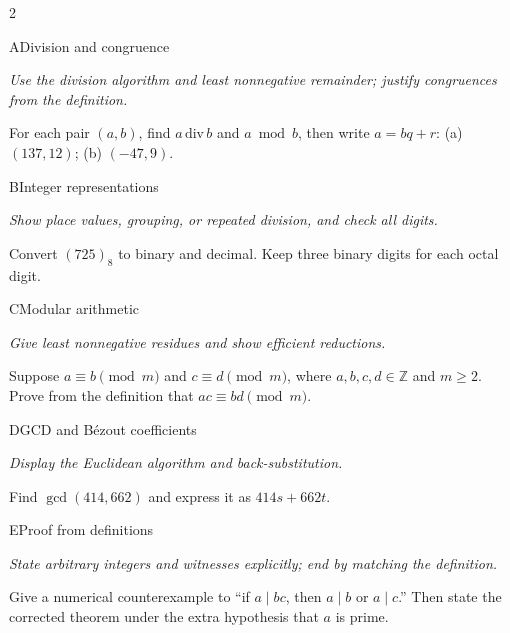 \documentclass[9pt]{extarticle}
\begin{document}
\begin{multicols}{2}
\begin{CoreProblem}{A}{Division and congruence}
{\scriptsize\textit{Use the division algorithm and least nonnegative remainder; justify congruences from the definition.}\par}
For each pair $(a,b)$, find $a\,\mathrm{div}\,b$ and $a\bmod b$, then write
$a=bq+r$: (a) $(137,12)$; (b) $(-47,9)$.
\end{CoreProblem}
\begin{CoreProblem}{B}{Integer representations}
{\scriptsize\textit{Show place values, grouping, or repeated division, and check all digits.}\par}
Convert $(725)_8$ to binary and decimal. Keep three binary digits for each
octal digit.
\end{CoreProblem}
\begin{CoreProblem}{C}{Modular arithmetic}
{\scriptsize\textit{Give least nonnegative residues and show efficient reductions.}\par}
Suppose $a\equiv b\pmod m$ and $c\equiv d\pmod m$, where
$a,b,c,d\in\mathbb Z$ and $m\ge2$. Prove from the definition that
$ac\equiv bd\pmod m$.
\end{CoreProblem}
\columnbreak
\begin{CoreProblem}{D}{GCD and B\'ezout coefficients}
{\scriptsize\textit{Display the Euclidean algorithm and back-substitution.}\par}
Find $\gcd(414,662)$ and express it as $414s+662t$.
\end{CoreProblem}
\begin{CoreProblem}{E}{Proof from definitions}
{\scriptsize\textit{State arbitrary integers and witnesses explicitly; end by matching the definition.}\par}
Give a numerical counterexample to ``if $a\mid bc$, then $a\mid b$ or
$a\mid c$.'' Then state the corrected theorem under the extra hypothesis that
$a$ is prime.
\end{CoreProblem}
\end{multicols}
\CoreWorkArea
\FormBreak
{}
\end{document}
